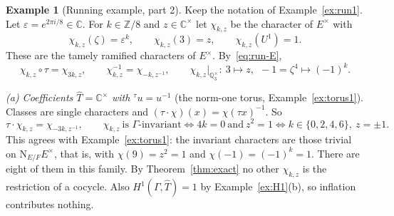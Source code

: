 \documentclass[12pt,letterpaper]{article}
\numberwithin{equation}{section}
\theoremstyle{plain}
\theoremstyle{definition}
\newtheorem{example}[theorem]{Example}
\newcommand{\Z}{\mathbb{Z}}
\newcommand{\C}{\mathbb{C}}
\newcommand{\Q}{\mathbb{Q}}
\newcommand{\Th}{\widehat{T}}
\newcommand{\act}[2]{{}^{#1}\!#2}          %
\newcommand{\Nm}{\mathrm{N}_{E/F}}
\begin{document}
\begin{example}[Running example, part 2]\label{ex:run2}
Keep the notation of Example~\ref{ex:run1}. Let
$\varepsilon=e^{2\pi i/8}\in\C$. For $k\in\Z/8$ and $z\in\C^\times$ let
$\chi_{k,z}$ be the character of $E^\times$ with
\[
\chi_{k,z}(\zeta)=\varepsilon^{k},\qquad\chi_{k,z}(3)=z,\qquad
\chi_{k,z}(U^1)=1 .
\]
These are the tamely ramified characters of $E^\times$. By~\eqref{eq:run-E},
\begin{equation}\label{eq:run-tau}
\chi_{k,z}\circ\tau=\chi_{3k,z},\qquad
\chi_{k,z}^{-1}=\chi_{-k,z^{-1}},\qquad
\chi_{k,z}|_{\Q_3^\times}:\ 3\mapsto z,\ \ -1=\zeta^4\mapsto(-1)^k .
\end{equation}

\smallskip\noindent\emph{(a) Coefficients $\Th=\C^\times$ with
$\act{\tau}{u}=u^{-1}$} (the norm-one torus, Example~\ref{ex:torus1}).
Classes are single characters and
$(\tau\cdot\chi)(x)=\chi(\tau x)^{-1}$. So
\[
\tau\cdot\chi_{k,z}=\chi_{-3k,z^{-1}},\qquad
\chi_{k,z}\ \text{is $\Gamma$-invariant}\iff 4k=0\ \text{and}\ z^2=1
\iff k\in\{0,2,4,6\},\ z=\pm1 .
\]
This agrees with Example~\ref{ex:torus1}: the invariant characters are
those trivial on $\Nm E^\times$, that is, with $\chi(9)=z^2=1$ and
$\chi(-1)=(-1)^k=1$. There are eight of them in this family. By
Theorem~\ref{thm:exact} no other $\chi_{k,z}$ is the restriction of a
cocycle. Also $H^1(\Gamma,\Th)=1$ by Example~\ref{ex:H1}(b), so inflation
contributes nothing.


\end{example}
\end{document}
